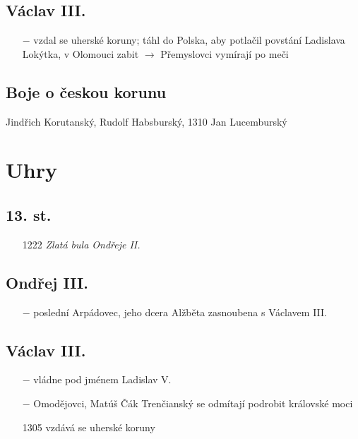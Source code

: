 \documentclass{article}
\begin{document}
\subsection*{Václav III.}
\begin{itemize}
    \vspace{-0.5em}
    \setlength\itemsep{0.15em}
    \item[$-$] vzdal se uherské koruny; táhl do Polska, aby potlačil povstání Ladislava Lokýtka, v Olomouci zabit $\rightarrow$ Přemyslovci vymírají po meči
\end{itemize}

\subsection*{Boje o českou korunu}
Jindřich Korutanský, Rudolf Habsburský, 1310 Jan Lucemburský

\section*{Uhry}

\subsection*{13. st.}
\begin{itemize}
    \vspace{-0.5em}
    \setlength\itemsep{0.15em}
    \item[1222] \textit{Zlatá bula Ondřeje II.}
\end{itemize}

\subsection*{Ondřej III.}
\begin{itemize}
    \vspace{-0.5em}
    \setlength\itemsep{0.15em}
    \item[$-$] poslední Arpádovec, jeho dcera Alžběta zasnoubena s Václavem III.
\end{itemize}

\subsection*{Václav III.}
\begin{itemize}
    \vspace{-0.5em}
    \setlength\itemsep{0.15em}
    \item[$-$] vládne pod jménem Ladislav V.
    \item[$-$] Omodějovci, Matúš Čák Trenčianský se odmítají podrobit královské moci
    \item[1305] vzdává se uherské koruny
\end{itemize}
\end{document}
